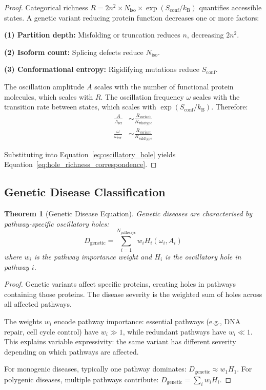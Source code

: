 \documentclass[11pt,twocolumn,a4paper]{article}
\newtheorem{theorem}{Theorem}[section]
\theoremstyle{definition}
\theoremstyle{remark}
\newcommand{\kB}{k_{\mathrm{B}}}
\begin{document}
\begin{proof}
Categorical richness $R = 2n^2 \times N_{\mathrm{iso}} \times \exp(S_{\mathrm{conf}}/\kB)$ quantifies accessible states. A genetic variant reducing protein function decreases one or more factors:

\textbf{(1) Partition depth:} Misfolding or truncation reduces $n$, decreasing $2n^2$.

\textbf{(2) Isoform count:} Splicing defects reduce $N_{\mathrm{iso}}$.

\textbf{(3) Conformational entropy:} Rigidifying mutations reduce $S_{\mathrm{conf}}$.

The oscillation amplitude $A$ scales with the number of functional protein molecules, which scales with $R$. The oscillation frequency $\omega$ scales with the transition rate between states, which scales with $\exp(S_{\mathrm{conf}}/\kB)$. Therefore:
\begin{align}
\frac{A}{A_{\mathrm{ref}}} &\sim \frac{R_{\mathrm{variant}}}{R_{\mathrm{wildtype}}} \label{eq:amplitude_richness} \\
\frac{\omega}{\omega_{\mathrm{ref}}} &\sim \frac{R_{\mathrm{variant}}}{R_{\mathrm{wildtype}}} \label{eq:frequency_richness}
\end{align}

Substituting into Equation~\eqref{eq:oscillatory_hole} yields Equation~\eqref{eq:hole_richness_correspondence}.
\end{proof}

\subsection{Genetic Disease Classification}

\begin{theorem}[Genetic Disease Equation]
\label{thm:genetic_disease}
Genetic diseases are characterised by pathway-specific oscillatory holes:
\begin{equation}
D_{\mathrm{genetic}} = \sum_{i=1}^{N_{\mathrm{pathways}}} w_i H_i(\omega_i, A_i)
\label{eq:genetic_disease}
\end{equation}
where $w_i$ is the pathway importance weight and $H_i$ is the oscillatory hole in pathway $i$.
\end{theorem}

\begin{proof}
Genetic variants affect specific proteins, creating holes in pathways containing those proteins. The disease severity is the weighted sum of holes across all affected pathways.

The weights $w_i$ encode pathway importance: essential pathways (e.g., DNA repair, cell cycle control) have $w_i \gg 1$, while redundant pathways have $w_i \ll 1$. This explains variable expressivity: the same variant has different severity depending on which pathways are affected.

For monogenic diseases, typically one pathway dominates: $D_{\mathrm{genetic}} \approx w_1 H_1$. For polygenic diseases, multiple pathways contribute: $D_{\mathrm{genetic}} = \sum_i w_i H_i$.
\end{proof}
\end{document}
